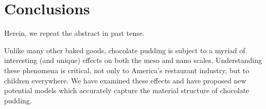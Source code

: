 \documentclass{ccr15}
\begin{document}
\section{Conclusions}
Herein, we repeat the abstract in past tense.

Unlike many other baked goods, chocolate pudding is subject to a myriad of interesting (and unique) effects on both the
meso and nano scales.  Understanding these phenomena is critical, not only to America's restaurant industry, but to
children everywhere.  We have examined these effects and have proposed new potential models which accurately capture
the material structure of chocolate pudding.




%
\end{document}
